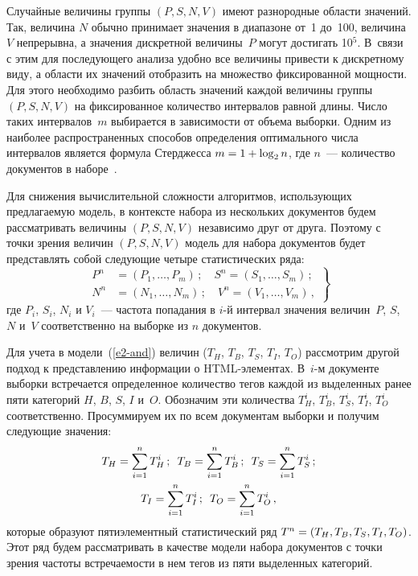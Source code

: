\begin{multicols}{2}
  Случайные величины группы $(P, S, N, V)$ имеют разнородные области 
значений. Так, величина $N$ обычно принимает значения в диапазоне от~1 
до~100, величина~$V$ непрерывна, а значения дискретной величины~$P$ 
могут достигать 10$^5$. В~связи с этим для последующего анализа удобно все 
величины при\-вес\-ти к дискретному виду, а области их значений отоб\-ра\-зить на 
множество фиксированной мощности. Для этого необходимо разбить область 
значений каж\-дой величины группы $(P, S, N, V)$ на фиксированное количество 
интервалов равной длины. Число таких интервалов~$m$ выбирается в 
зависимости от объема выборки. Одним из наиболее распространенных 
способов определения оптимального числа интервалов является формула 
Стерджесса $m\hm=1\hm+\log_2n$, где $n$~--- количество документов в 
наборе~\cite{13-and}.
  
  Для снижения вычислительной сложности алгоритмов, использующих 
предлагаемую модель, в контексте набора из нескольких документов будем 
рассматривать величины $(P, S, N, V)$ независимо друг от друга. Поэтому с 
точки зрения величин $(P, S, N, V)$ модель для набора документов будет 
представлять собой следующие четыре статистических ряда:
  \begin{equation}
  \left.
  \begin{array}{rl}
  P^n & =(P_1, \ldots , P_m)\,;\quad S^n=(S_1, \ldots , S_m)\,;\\[9pt]
  N^n & =(N_1, \ldots , N_m)\,; \quad V^n=(V_1, \ldots , V_m)\,,
  \end{array}
  \right\}
  \label{e2-and}
  \end{equation}
  где $P_i$, $S_i$, $N_i$ и $V_i$~--- частота попадания в $i$-й интервал 
значения величин~$P$, $S$, $N$ и~$V$ соответственно на выборке из $n$ 
документов.
  
    Для учета в модели~(\ref{e2-and}) величин ($T_H$, $T_B$, $T_S$, $T_I$, $T_O$) 
рассмотрим другой подход к представлению информации о HTML-эле\-мен\-тах. 
В~$i$-м документе выборки встречается определенное количество тегов 
каждой из выделенных ранее пяти категорий $H$, $B$, $S$, $I$ и~$O$. 
Обозначим эти количества $T_H^i$, $T_B^i$, $T_S^i$, $T_I^i$, $T_O^i$ соответственно. Просуммируем их по всем 
документам выборки и получим следующие значения: 
  \begin{gather*}
  T_H=\sum\limits_{i=1}^n T_H^i\,;\enskip  T_B=\sum\limits_{i=1}^n T_B^i\,;\enskip 
T_S=\sum\limits_{i=1}^n T_S^i\,;\\
T_I=\sum\limits_{i=1}^n T_I^i\,; \enskip
T_O=\sum\limits_{i=1}^n T_O^i\,,
\end{gather*}
которые образуют пятиэлементный 
статистический ряд $T^n\hm=(T_H, T_B, T_S, T_I, T_O)$. Этот ряд будем 
рассматривать в качестве модели набора документов с точки зрения частоты 
встречаемости в нем тегов из пяти выделенных категорий.
  

\end{multicols}
